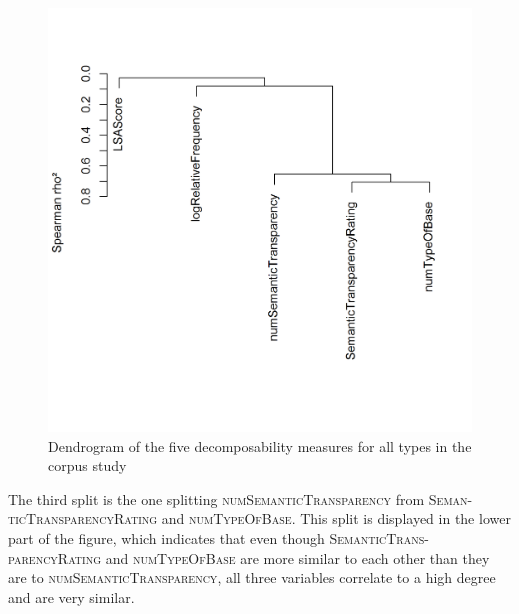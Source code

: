       
     \begin{figure}
    	
    	\includegraphics[scale=0.5]{images/Corpus/clusterAnalysisDecomposabilityCorpusAllTypes.png}
    	\caption{ Dendrogram of the five decomposability measures for all types in the corpus study}
    	\label{fig:cluster corpus all affixes}
    \end{figure}
      
      
  The third split is the one splitting \textsc{numSemanticTransparency} from \textsc{Seman-ticTransparencyRating} and \textsc{numTypeOfBase}. This split is displayed in the lower part of the figure, which indicates that even though  \textsc{SemanticTrans-parencyRating} and \textsc{numTypeOfBase} are more similar to each other than they are to \textsc{numSemanticTransparency}, all three variables correlate to a high degree and are very similar.
  

